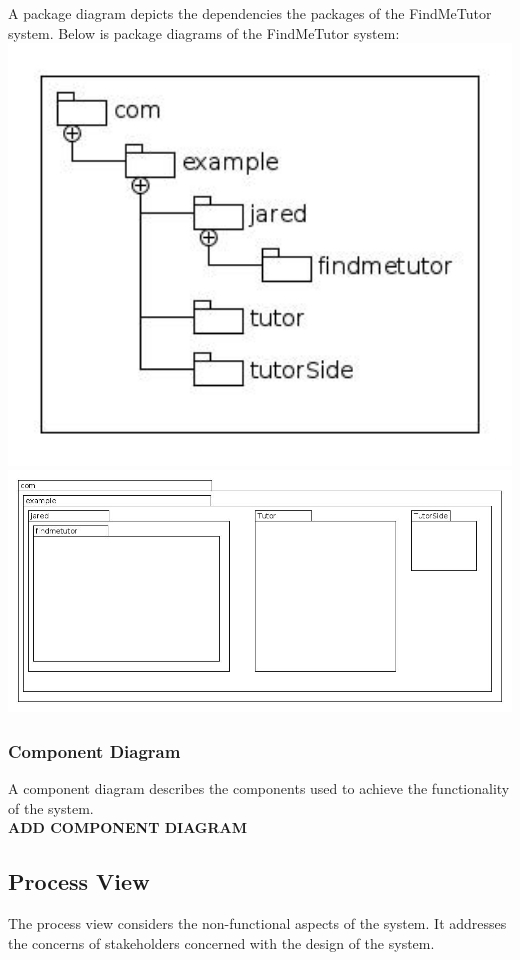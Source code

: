\documentclass[12pt]{article}
\begin{document}
A package diagram depicts the dependencies the packages of the FindMeTutor system.
Below is package diagrams of the FindMeTutor system:\\
\includegraphics[width=140mm]{./Pakage.jpg}
\includegraphics[width=140mm]{./Pakage2.jpg}

\subsubsection{Component Diagram}
A component diagram describes the components used to achieve the functionality of the system.\\
\textbf{ADD COMPONENT DIAGRAM}


\subsection{Process View}
The process view considers the non-functional aspects of the system. It addresses the concerns of stakeholders concerned
with the design of the system.\\
\end{document}
